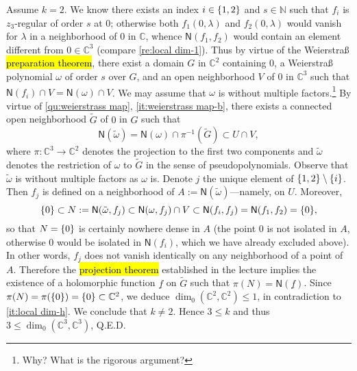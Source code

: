 \documentclass[a4paper]{amsart}
\newcommand{\N}{\mathbb{N}}
\newcommand{\C}{\mathbb{C}}
\newcommand{\Zero}[1]{\mathsf{N}(#1)}
\theoremstyle{remark}
\numberwithin{equation}{question}
\DeclarePairedDelimiter\set{\{}{\}}
\begin{document}
\begin{solution}
\begin{solenum}
Assume $k=2$. We know there exists an index $i \in \set{1,2}$ and $s \in \N$ such that $f_i$ is $z_3$-regular of order $s$ at $0$; otherwise both $f_1(0,\lambda)$ and $f_2(0,\lambda)$ would vanish for $\lambda$ in a neighborhood of $0$ in $\C$, whence $\Zero{f_1,f_2}$ would contain an element different from $0 \in \C^3$ (compare \cref{re:local dim-1}). Thus by virtue of the Weierstraß \hl{preparation theorem}, there exist a domain $G$ in $\C^2$ containing $0$, a Weierstraß polynomial $\omega$ of order $s$ over $G$, and an open neighborhood $V$ of $0$ in $\C^3$ such that $\Zero{f_i} \cap V = \Zero\omega \cap V$. We may assume that $\omega$ is without multiple factors.\footnote{Why? What is the rigorous argument?} By virtue of \cref{qu:weierstrass map}, \cref{it:weierstrass map-b}, there exists a connected open neighborhood $\tilde G$ of $0$ in $G$ such that
\[
\Zero{\tilde\omega} = \Zero\omega \cap \pi^{-1}(\tilde G) \subset U \cap V,
\]
where $\pi \colon \C^3 \to \C^2$ denotes the projection to the first two components and $\tilde\omega$ denotes the restriction of $\omega$ to $\tilde G$ in the sense of pseudopolynomials. Observe that $\tilde\omega$ is without multiple factors as $\omega$ is. Denote $j$ the unique element of $\set{1,2} \setminus \set i$. Then $f_j$ is defined on a neighborhood of $A := \Zero{\tilde\omega}$---namely, on $U$. Moreover,
\[
\set 0 \subset N := \Zero{\tilde\omega,f_j} \subset \Zero{\omega,f_j} \cap V \subset \Zero{f_i,f_j} = \Zero{f_1,f_2} = \set 0,
\]
so that $N = \set 0$ is certainly nowhere dense in $A$ (the point $0$ is not isolated in $A$, otherwise $0$ would be isolated in $\Zero{f_i}$, which we have already excluded above). In other words, $f_j$ does not vanish identically on any neighborhood of a point of $A$. Therefore the \hl{projection theorem} established in the lecture implies the existence of a holomorphic function $\underline f$ on $\tilde G$ such that $\pi(N) = \Zero{\underline f}$. Since $\pi(N) = \pi(\set 0) = \set 0 \subset \C^2$, we deduce $\dim_0(\C^2,\C^2) \le 1$, in contradiction to \cref{it:local dim-h}. We conclude that $k \ne 2$. Hence $3 \le k$ and thus $3 \le \dim_0(\C^3,\C^3)$, Q.E.D.


\end{solenum}
\end{solution}
\end{document}
